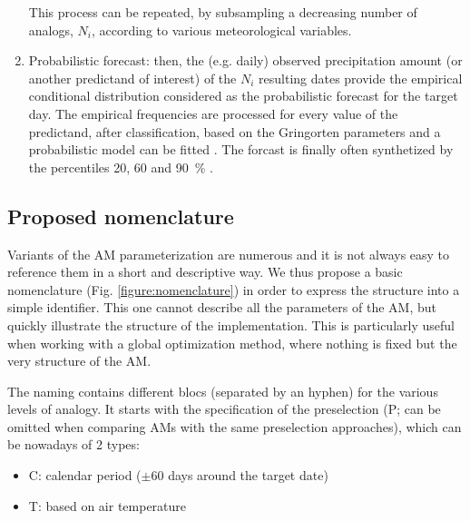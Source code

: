 \documentclass[review]{elsarticle}
\begin{document}
\begin{enumerate}
	This process can be repeated, by subsampling a decreasing number of analogs, $N_{i}$, according to various meteorological variables.
	
	\item Probabilistic forecast: then, the (e.g. daily) observed precipitation amount (or another predictand of interest) of the $N_{i}$ resulting dates provide the empirical conditional distribution considered as the probabilistic forecast for the target day. The empirical frequencies are processed for every value of the predictand, after classification, based on the Gringorten parameters \cite[for a Gumbel or exponential law; see][]{Gringorten1963} and a probabilistic model can be fitted \citep[e.g. Gamma function,][]{Obled2002}. The forcast is finally often synthetized by the percentiles 20, 60 and 90~\% \citep{Guilbaud1997, Guilbaud1998}.
	
\end{enumerate}


\subsection{Proposed nomenclature}

Variants of the AM parameterization are numerous and it is not always easy to reference them in a short and descriptive way. We thus propose a basic nomenclature (Fig. \ref{figure:nomenclature}) in order to express the structure into a simple identifier. This one cannot describe all the parameters of the AM, but quickly illustrate the structure of the implementation. This is particularly useful when working with a global optimization method, where nothing is fixed but the very structure of the AM.

The naming contains different blocs (separated by an hyphen) for the various levels of analogy. It starts with the specification of the preselection (P; can be omitted when comparing AMs with the same preselection approaches), which can be nowadays of 2 types:
\begin{itemize}
	\setlength\itemsep{-2px}
	\item C: calendar period ($\pm 60$ days around the target date)
	\item T: based on air temperature \citep{BenDaoud2010}
\end{itemize}
\end{document}
